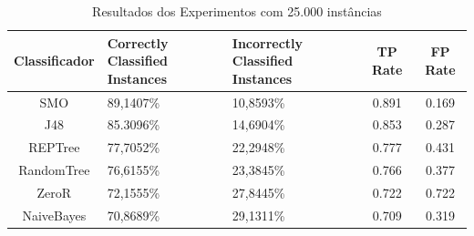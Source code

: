 \documentclass[
	12pt,				%
	openright,			%
	oneside,	
	a4paper,				%
	english,				%
	brazil				%
]{abntex2/abntex2} %
\begin{document}
\begin{table}[htbp]
	\centering
	\caption{Resultados dos Experimentos com 25.000 instâncias}
	\label{tabResultadosExperimentos25k}
	\begin{center}
		\renewcommand{\arraystretch}{2}
		\begin{tabular}{cp{3cm}p{3.2cm}cc}
			\hline
			\textbf{Classificador}                & \textbf{Correctly Classified Instances}               & \textbf{Incorrectly Classified Instances}      	& \textbf{TP Rate}						&\textbf{FP Rate}   \\ \hline
			SMO                                      & 89,1407\%                                                                                 & 10,8593\% 							&0.891									&0.169                                                                                    \\
			J48                                      & 85.3096\%                                                                                  & 14,6904\% 							&0.853										&0.287                                                                                     \\
			REPTree                                  & 77,7052\%                                                                                 & 22,2948\%								&0.777											&0.431                                                                                     \\ 
			RandomTree                               & 76,6155\%                                                                                 & 23,3845\%								&0.766												&0.377                                                                                     \\ \hline \hline
			ZeroR    									& 72,1555\%                                                 									& 27,8445\%								&0.722											&0.722                                                     								\\ 
			NaiveBayes                               & 70,8689\%                                                                                 &  29,1311\%									&0.709												&0.319                                                                                     \\ \hline
		\end{tabular}
	\end{center}
\end{table}

	\newpage	
	
\end{document}
